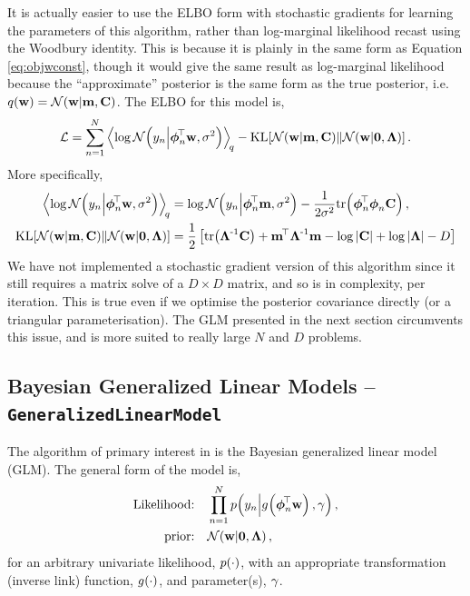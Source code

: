 \documentclass[11pt, oneside]{article}
\begin{document}
It is actually easier to use the ELBO form with stochastic gradients for
learning the parameters of this algorithm, rather than log-marginal likelihood
recast using the Woodbury identity.  This is because it is plainly in the same
form as Equation \eqref{eq:objwconst}, though it would give the same result as
log-marginal likelihood because the ``approximate'' posterior is the same form
as the true posterior, i.e.\ $q\!\left({\mathbf{w}}\right) = \mathcal{N}\!\left({\mathbf{w}}\middle\vert{\ensuremath{\mathbf{m}},
    \ensuremath{\mathbf{C}}}\right)$. The ELBO for this model is,
\begin{equation}
    \elbo = \sum^N_{n=1} 
    \expec{q}{\log\gausC{\targs_n}{\feats_n\T\weights, \var}}
    - \KL{\gausC{\weights}{\pomean, \pocov}}
        {\gausC{\weights}{\mathbf{0}, \Reg}}.
    \label{eq:slmobj}
\end{equation}
More specifically,
\begin{align*}
    \expec{q}{\log\gausC{\targs_n}{\feats_n\T\weights, \var}} &=
    \log \gausC{\targs_n}{\feats_n\T\pomean, \var}
    - \frac{1}{2 \var} \trace{\feats_n\T\feats_n\pocov}, \\
    \KL{\gausC{\weights}{\pomean, \pocov}}
        {\gausC{\weights}{\mathbf{0}, \Reg}} &=
        \frac{1}{2} \sbrac{\trace{\Reg\inv\pocov} + \pomean\T\Reg\inv\pomean 
        -  \log\deter{\pocov} + \log\deter{\Reg} - D}
\end{align*}
We have not implemented a stochastic gradient version of this algorithm since
it still requires a matrix solve of a $D \times D$ matrix, and so is 
in complexity, per iteration. This is true even if we optimise the posterior
covariance directly (or a triangular parameterisation). The GLM presented in
the next section circumvents this issue, and is more suited to really large $N$
and $D$ problems.


\subsection{Bayesian Generalized Linear Models --
    \texttt{GeneralizedLinearModel}}

The algorithm of primary interest in \revrand{} is the Bayesian generalized
linear model (GLM). The general form of the model is,
\begin{align}
    \text{Likelihood:} \quad &\prod^N_{n=1} 
        \probC{\targs_n}{\activ{\feats_n\T\weights}, \lparam}, 
        \label{eq:glm_like} \\
    \text{prior:} \quad &\gausC{\weights}{\mathbf{0}, \Reg},
        \label{eq:glm_prior}
\end{align}
for an arbitrary univariate likelihood, $p\!\left({\cdot}\right)$, with an appropriate
transformation (inverse link) function, ${g}_{}\!\left({{\cdot}}\right)$, and parameter(s),
$\gamma$. 
\end{document}
